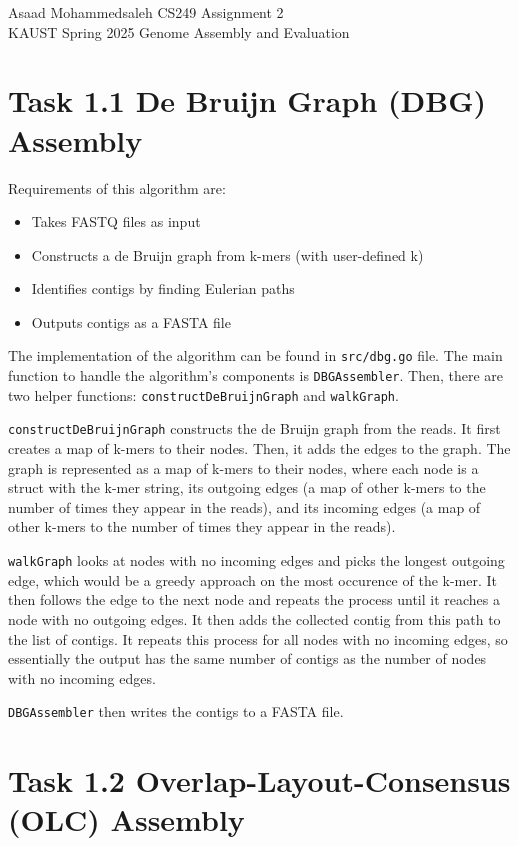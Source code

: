 \documentclass[12pt]{article}
\begin{document}
\noindent Asaad Mohammedsaleh \hfill CS249 Assignment 2\\
KAUST Spring 2025 \hfill Genome Assembly and Evaluation


\hrulefill


\section{Task 1.1 De Bruijn Graph (DBG) Assembly}

Requirements of this algorithm are:
\begin{itemize}
    \item Takes FASTQ files as input
    \item Constructs a de Bruijn graph from k-mers (with user-defined k)
    \item Identifies contigs by finding Eulerian paths
    \item Outputs contigs as a FASTA file
\end{itemize}

The implementation of the algorithm can be found in \texttt{src/dbg.go} file. The main function to handle the algorithm's components is \texttt{DBGAssembler}.
Then, there are two helper functions: \texttt{constructDeBruijnGraph} and \texttt{walkGraph}.

\texttt{constructDeBruijnGraph} constructs the de Bruijn graph from the reads. It first creates a map of k-mers to their nodes. Then, it adds the edges to the graph. The graph is represented as a map of k-mers to their nodes, where each node is a struct with the k-mer string, its outgoing edges (a map of other k-mers to the number of times they appear in the reads), and its incoming edges (a map of other k-mers to the number of times they appear in the reads).

\texttt{walkGraph} looks at nodes with no incoming edges and picks the longest outgoing edge, which would be a greedy approach on the most occurence of the k-mer. It then follows the edge to the next node and repeats the process until it reaches a node with no outgoing edges. It then adds the collected contig from this path to the list of contigs. It repeats this process for all nodes with no incoming edges, so essentially the output has the same number of contigs as the number of nodes with no incoming edges.

\texttt{DBGAssembler} then writes the contigs to a FASTA file.

\section{Task 1.2 Overlap-Layout-Consensus (OLC) Assembly}
\end{document}

